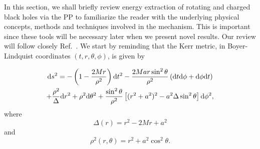 In this section, we shall briefly review energy extraction of rotating and charged black holes via the \ac{PP} to familiarize the reader with the underlying physical concepts, methods and techniques involved in the mechanism. This is important since these tools will be necessary later when we present novel results. Our review will follow closely Ref.~\cite{carroll}. We start by reminding that the Kerr metric, in Boyer-Lindquist coordinates $(t, r, \theta, \phi)$, is given by

\begin{multline}
  \mathrm{d} s^2 = -\left(1 - \frac{2 M r}{\rho^2}\right)\mathrm{d} t^2 - \frac{2 M a r \sin^2\theta}{\rho^2}\left( \mathrm{d} t \mathrm{d} \phi + \mathrm{d} \phi \mathrm{d} t \right)\\
  + \frac{\rho^2}{\Delta} \mathrm{d} r^2 + \rho^2 \mathrm{d}\theta^2 + \frac{\sin^2\theta}{\rho^2}\left[ (r^2 + a^2)^2 - a^2\Delta\sin^2\theta \right]\mathrm{d}\phi^2,
  \label{eq:kerr_penrose_review_kerr_metric}
\end{multline}
%
where
%
\begin{equation}
  \Delta(r) = r^2 - 2Mr + a^2
  \label{eq:kerr_penrose_review_kerr_delta}
\end{equation}
%
and
%
\begin{equation}
  \rho^2(r, \theta) = r^2 + a^2\cos^2\theta.
  \label{eq:kerr_penrose_review_kerr_rho}
\end{equation}

